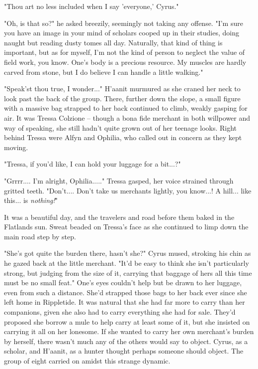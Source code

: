 "Thou art no less included when I say 'everyone,' Cyrus."

"Oh, is that so?" he asked breezily, seemingly not taking any offense. "I'm sure you have an image in your mind of scholars cooped up in their studies, doing naught but reading dusty tomes all day. Naturally, that kind of thing is important, but as for myself, I'm not the kind of person to neglect the value of field work, you know. One's body is a precious resource. My muscles are hardly carved from stone, but I do believe I can handle a little walking."

"Speak'st thou true, I wonder..." H'aanit murmured as she craned her neck to look past the back of the group. There, further down the slope, a small figure with a massive bag strapped to her back continued to climb, weakly gasping for air. It was Tressa Colzione -- though a bona fide merchant in both willpower and way of speaking, she still hadn't quite grown out of her teenage looks. Right behind Tressa were Alfyn and Ophilia, who called out in concern as they kept moving.

"Tressa, if you'd like, I can hold your luggage for a bit...?"

"Grrrr.... I'm alright, Ophilia....." Tressa gasped, her voice strained through gritted teeth. "Don't.... Don't take us merchants lightly, you know...! A hill... like this... is \emph{nothing!}"

It was a beautiful day, and the travelers and road before them baked in the Flatlands sun. Sweat beaded on Tressa's face as she continued to limp down the main road step by step.

"She's got quite the burden there, hasn't she?" Cyrus mused, stroking his chin as he gazed back at the little merchant. "It'd be easy to think she isn't particularly strong, but judging from the size of it, carrying that baggage of hers all this time must be no small feat." One's eyes couldn't help but be drawn to her luggage, even from such a distance. She'd strapped those bags to her back ever since she left home in Rippletide. It was natural that she had far more to carry than her companions, given she also had to carry everything she had for sale. They'd proposed she borrow a mule to help carry at least some of it, but she insisted on carrying it all on her lonesome. If she wanted to carry her own merchant's burden by herself, there wasn't much any of the others would say to object. Cyrus, as a scholar, and H'aanit, as a hunter thought perhaps someone should object. The group of eight carried on amidst this strange dynamic.


